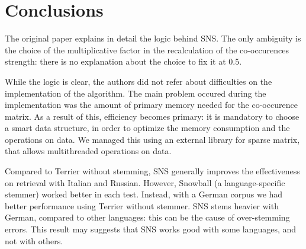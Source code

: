 \section{Conclusions}
The original paper\cite{sns} explains in detail the logic behind SNS. The only ambiguity is the choice of the multiplicative factor in the recalculation of the co-occurences strength: there is no explanation about the choice to fix it at 0.5.

While the logic is clear, the authors did not refer about difficulties on the implementation of the algorithm. The main problem occured during the implementation was the amount of primary memory needed for the co-occurence matrix. As a result of this, efficiency becomes primary: it is mandatory to choose a smart data structure, in order to optimize the memory consumption and the operations on data. We managed this using an external library for sparse matrix, that allows multithreaded operations on data.

Compared to Terrier without stemming, SNS generally improves the effectiveness on retrieval with Italian and Russian. However, Snowball (a language-specific stemmer) worked better in each test. Instead, with a German corpus we had better performance using Terrier without stemmer. SNS stems heavier with German, compared to other languages: this can be the cause of over-stemming errors. This result may suggests that SNS works good with some languages, and not with others.  